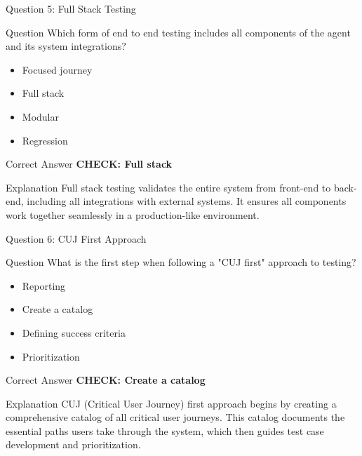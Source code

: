 \documentclass[aspectratio=169]{beamer}
\begin{document}
\begin{frame}{Question 5: Full Stack Testing}
  \begin{block}{Question}
    Which form of end to end testing includes all components of the agent and its system integrations?
  \end{block}
  
  
  
  \begin{itemize}
    \item Focused journey
    \item Full stack
    \item Modular
    \item Regression
  \end{itemize}
  
  
  
  \begin{alertblock}{Correct Answer}
    \textcolor{GoogleGreen}{\textbf{CHECK: Full stack}}
  \end{alertblock}
  
  \vspace{0.2cm}
  
  \begin{block}{Explanation}
    \small
    Full stack testing validates the entire system from front-end to back-end, including all integrations with external systems. It ensures all components work together seamlessly in a production-like environment.
  \end{block}
\end{frame}

\begin{frame}{Question 6: CUJ First Approach}
  \begin{block}{Question}
    What is the first step when following a "CUJ first" approach to testing?
  \end{block}
  
  
  
  \begin{itemize}
    \item Reporting
    \item Create a catalog
    \item Defining success criteria
    \item Prioritization
  \end{itemize}
  
  
  
  \begin{alertblock}{Correct Answer}
    \textcolor{GoogleGreen}{\textbf{CHECK: Create a catalog}}
  \end{alertblock}
  
  \vspace{0.2cm}
  
  \begin{block}{Explanation}
    \small
    CUJ (Critical User Journey) first approach begins by creating a comprehensive catalog of all critical user journeys. This catalog documents the essential paths users take through the system, which then guides test case development and prioritization.
  \end{block}
\end{frame}
\end{document}
